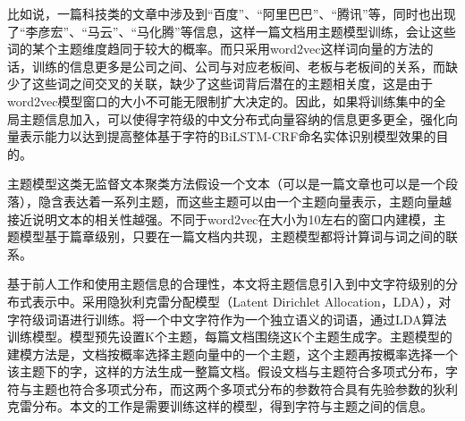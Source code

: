\documentclass[winfonts,master,oneside,nobackinfo]{njuthesis}
\begin{document}
比如说，一篇科技类的文章中涉及到“百度”、“阿里巴巴”、“腾讯”等，同时也出现了“李彦宏”、“马云”、“马化腾”等信息，这样一篇文档用主题模型训练，会让这些词的某个主题维度趋同于较大的概率。而只采用word2vec这样词向量的方法的话，训练的信息更多是公司之间、公司与对应老板间、老板与老板间的关系，而缺少了这些词之间交叉的关联，缺少了这些词背后潜在的主题相关度，这是由于word2vec模型窗口的大小不可能无限制扩大决定的。因此，如果将训练集中的全局主题信息加入，可以使得字符级的中文分布式向量容纳的信息更多更全，强化向量表示能力以达到提高整体基于字符的BiLSTM-CRF命名实体识别模型效果的目的。

主题模型这类无监督文本聚类方法假设一个文本（可以是一篇文章也可以是一个段落），隐含表达着一系列主题，而这些主题可以由一个主题向量表示，主题向量越接近说明文本的相关性越强。不同于word2vec在大小为10左右的窗口内建模，主题模型基于篇章级别，只要在一篇文档内共现，主题模型都将计算词与词之间的联系。

基于前人工作和使用主题信息的合理性，本文将主题信息引入到中文字符级别的分布式表示中。采用隐狄利克雷分配模型（Latent Dirichlet Allocation，LDA），对字符级词语进行训练。将一个中文字符作为一个独立语义的词语，通过LDA算法训练模型。模型预先设置K个主题，每篇文档围绕这K个主题生成字。主题模型的建模方法是，文档按概率选择主题向量中的一个主题，这个主题再按概率选择一个该主题下的字，这样的方法生成一整篇文档。假设文档与主题符合多项式分布，字符与主题也符合多项式分布，而这两个多项式分布的参数符合具有先验参数的狄利克雷分布。本文的工作是需要训练这样的模型，得到字符与主题之间的信息。

\end{document}
